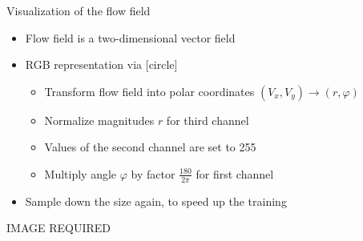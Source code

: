\begin{frame}{Visualization of the flow field}
\begin{itemize}
\item Flow field is a two-dimensional vector field
\item RGB representation via
[circle]
\begin{itemize}
\item Transform flow field into polar coordinates $(V_x,V_y) \to (r, \varphi)$
\item Normalize magnitudes $r$ for third channel
\item Values of the second channel are set to 255
\item Multiply angle $\varphi$ by factor $\frac{180}{2\pi}$ for first channel
\end{itemize}
\item Sample down the size again, to speed up the training
\end{itemize}
IMAGE REQUIRED
\end{frame}


